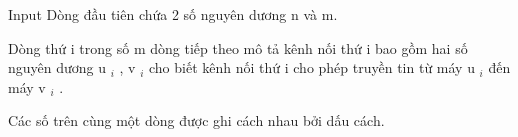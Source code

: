 Input
Dòng đầu tiên chứa 2 số nguyên dương n và m.

Dòng thứ i trong số m dòng tiếp theo mô tả kênh nối thứ i bao gồm hai số nguyên dương u­ $_ i $ , v $_ i $ cho biết kênh nối thứ i cho phép truyền tin từ máy u $_ i $ đến máy v $_ i $ .

Các số trên cùng một dòng được ghi cách nhau bởi dấu cách.